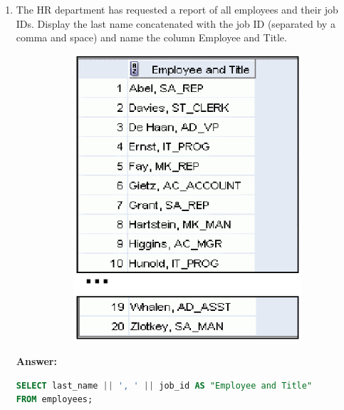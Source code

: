 \documentclass[a4paper,12pt]{article}
\begin{document}
\begin{enumerate}[start=8]
    \newpage
    \item The HR department has requested a report of all employees and their job IDs. Display the last name concatenated with the job ID (separated by a comma and space) and name the column Employee and Title.
    \begin{figure}[h]
        \centering
        \begin{subfigure}[b]{0.5\linewidth}
            \centering
            \includegraphics[width=\linewidth]{graphics/9.png}
        \end{subfigure}
    \end{figure}
    
    \textbf{Answer: }
    \begin{lstlisting}[language=SQL, label={lst:concat_query}]
SELECT last_name || ', ' || job_id AS "Employee and Title"
FROM employees;
    \end{lstlisting}
    

\end{enumerate}
\end{document}
